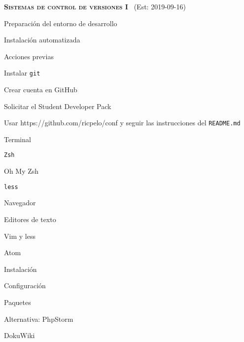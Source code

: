 \begin{longenum}
    \item \textbf{\textsc{Sistemas de control de versiones I}} \ (Est: 2019-09-16)
    \begin{longenum}
        \item Preparación del entorno de desarrollo
        \begin{longenum}
            \item Instalación automatizada
            \begin{longenum}
                \item Acciones previas
                \begin{longenum}
                    \item Instalar \texttt{git}
                    \item Crear cuenta en GitHub
                    \item Solicitar el Student Developer Pack
                \end{longenum}
                \item Usar https://github.com/ricpelo/conf y seguir las instrucciones del \texttt{README.md}
            \end{longenum}
            \item Terminal
            \begin{longenum}
                \item \texttt{Zsh}
                \item Oh My Zsh
                \item \texttt{less}
            \end{longenum}
            \item Navegador
            \item Editores de texto
            \begin{longenum}
                \item Vim y less
                \item Atom
                \begin{longenum}
                    \item Instalación
                    \item Configuración
                    \item Paquetes
                \end{longenum}
                \item Alternativa: PhpStorm
            \end{longenum}
            \item DokuWiki \opcional\

\end{longenum}
\end{longenum}
\end{longenum}
